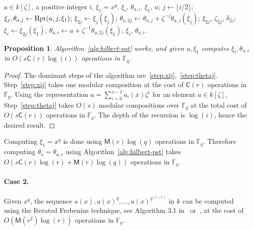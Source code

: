 \documentclass[12pt]{article}
\theoremstyle{plain}
\newtheorem{proposition}[theorem]{Proposition}
\theoremstyle{definition}
\def\F{\ensuremath{\mathbb{F}}}
\def\MM{\ensuremath{\mathsf{M}}}
\def\CC{\ensuremath{\mathsf{C}}}
\newcounter{algorithm}
\begin{document}
\begin{algorithm}
	\label{alg:hilbert-pst}
	\begin{algorithmic}[1]
		\REQUIRE $a \in k[\zeta]$, a positive integer $i$, $\xi_1=x^q$.
		\ENSURE $\xi_i$, $\theta_{a, i}$.
		\RETURN $\xi_1$, $a$;
		\ENDIF
		\STATE $j \leftarrow \lfloor i / 2 \rfloor$;
		\STATE $\xi_{j},\theta_{a, j} \leftarrow {\rm Hpt}(a, j, \xi_1)$;
		\STATE\label{step:xij} $\xi_{2j} \leftarrow \xi_j(\xi_j)$;
		\STATE\label{step:thetaj} $\theta_{a, 2j} \leftarrow \theta_{a, j} + \zeta^{-j}\theta_{a, 
			j}(\xi_j)$;
		\RETURN $\xi_{2j}$, $\zeta_{2j}$, $\delta_{2j}$;
		\ENDIF
		\STATE $\xi_i \leftarrow \xi_{2j}(\xi_1)$;
		\STATE $\theta_{a, i} \leftarrow a + \zeta^{-1}\theta_{a, 2j}(\xi_1)$;
		\RETURN $\xi_i$, $\theta_{a, i}$.
	\end{algorithmic}
\end{algorithm}

\begin{proposition}
	\label{prop:xitheta}
	Algorithm~\ref{alg:hilbert-pst} works, and given $a, \xi_1$ computes $\xi_i, \theta_{a, i}$ in  
	$O(s\CC(r)\log(i))$ operations in $\F_q$.
\end{proposition}
\begin{proof}
	The dominant steps of the algorithm are~\ref{step:xij},~\ref{step:thetaj}. Step~\ref{step:xij} 
	takes one modular composition at the cost of $\CC(r)$ operations in $\F_q$. Using the 
	representation $a = \sum_{i = 0}^{s - 1}a_i(x)\zeta^i$ for an element $a \in k[\zeta]$, Step~\ref{step:thetaj} 
	takes $O(s)$ modular compositions over $\F_q$ at the total cost of 
	$O(s\CC(r))$ operations in $\F_q$. The depth of the recursion is $\log(i)$, hence the desired 
	result.
\end{proof}
Computing $\xi_1 = x^q$ is done using $\MM(r)\log(q)$ operations in $\F_q$. Therefore computing 
$\theta_a = \theta_{a, r}$ using Algorithm~\ref{alg:hilbert-pst} takes $O(s\CC(r)\log(r) + 
\MM(r)\log(q))$ operations in $\F_q$.

\paragraph{Case 2.} 
Given $x^q$, the sequence $a(x), a(x)^q, \dots, 
a(x)^{q^{(r - 1)}}$ in $k$ can be computed using the Iterated Frobenius technique, see Algorithm 
3.1 in~\cite{von1992computing} or~\cite[Ch.~14.7]{vzGG}, at the cost of $O(\MM(r^2)\log(r))$ 
operations in $\F_q$.
\end{document}
